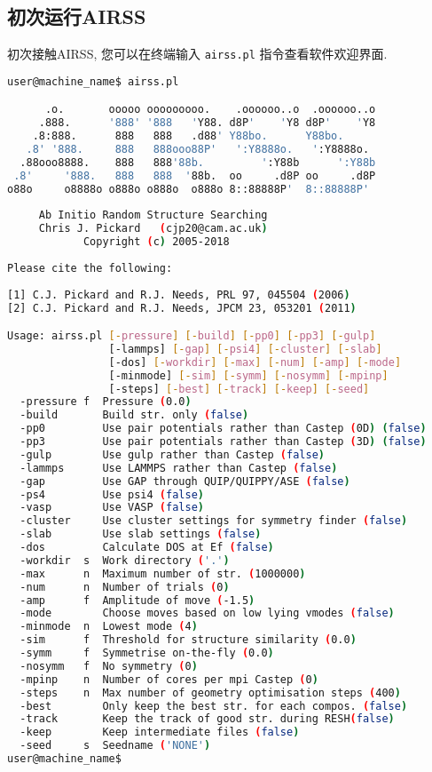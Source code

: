 \documentclass[a4paper, 10pt]{article}
\begin{document}
\subsection{初次运行AIRSS}
初次接触AIRSS, 您可以在终端输入 \verb|airss.pl| 指令查看软件欢迎界面.
\newpage
\begin{lstlisting}[language={bash}]
user@machine_name$ airss.pl

      .o.       ooooo ooooooooo.    .oooooo..o  .oooooo..o 
     .888.      '888' '888   'Y88. d8P'    'Y8 d8P'    'Y8 
    .8:888.      888   888   .d88' Y88bo.      Y88bo.      
   .8' '888.     888   888ooo88P'   ':Y8888o.   ':Y8888o.  
  .88ooo8888.    888   888'88b.         ':Y88b      ':Y88b 
 .8'     '888.   888   888  '88b.  oo     .d8P oo     .d8P 
o88o     o8888o o888o o888o  o888o 8::88888P'  8::88888P'  
                                                      
     Ab Initio Random Structure Searching             
     Chris J. Pickard   (cjp20@cam.ac.uk)            
            Copyright (c) 2005-2018                   
                                                      
Please cite the following:                                 
                                                      
[1] C.J. Pickard and R.J. Needs, PRL 97, 045504 (2006)     
[2] C.J. Pickard and R.J. Needs, JPCM 23, 053201 (2011)    

Usage: airss.pl [-pressure] [-build] [-pp0] [-pp3] [-gulp] 
                [-lammps] [-gap] [-psi4] [-cluster] [-slab] 
                [-dos] [-workdir] [-max] [-num] [-amp] [-mode] 
                [-minmode] [-sim] [-symm] [-nosymm] [-mpinp] 
                [-steps] [-best] [-track] [-keep] [-seed]
  -pressure f  Pressure (0.0)
  -build       Build str. only (false)
  -pp0         Use pair potentials rather than Castep (0D) (false)
  -pp3         Use pair potentials rather than Castep (3D) (false)
  -gulp        Use gulp rather than Castep (false)
  -lammps      Use LAMMPS rather than Castep (false)
  -gap         Use GAP through QUIP/QUIPPY/ASE (false)
  -ps4         Use psi4 (false)
  -vasp        Use VASP (false)
  -cluster     Use cluster settings for symmetry finder (false)
  -slab        Use slab settings (false)
  -dos         Calculate DOS at Ef (false)
  -workdir  s  Work directory ('.')
  -max      n  Maximum number of str. (1000000)
  -num      n  Number of trials (0)
  -amp      f  Amplitude of move (-1.5)
  -mode        Choose moves based on low lying vmodes (false)
  -minmode  n  Lowest mode (4)
  -sim      f  Threshold for structure similarity (0.0)
  -symm     f  Symmetrise on-the-fly (0.0)
  -nosymm   f  No symmetry (0)
  -mpinp    n  Number of cores per mpi Castep (0)
  -steps    n  Max number of geometry optimisation steps (400)
  -best        Only keep the best str. for each compos. (false)
  -track       Keep the track of good str. during RESH(false)
  -keep        Keep intermediate files (false)
  -seed     s  Seedname ('NONE')
user@machine_name$
\end{lstlisting}
\end{document}
